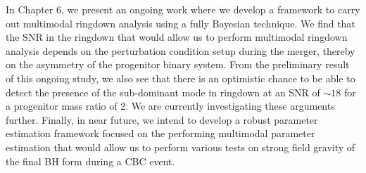 In Chapter 6, we present an ongoing work where we develop a framework to carry out multimodal ringdown analysis using a fully Bayesian technique. We find that the SNR in the ringdown that would allow us to perform multimodal ringdown analysis depends on the perturbation condition setup during the merger, thereby on the asymmetry of the progenitor binary system.  From the preliminary result of this ongoing study, we also see that there is an optimistic chance to be able to detect the presence of the sub-dominant mode in ringdown at an SNR of $\sim 18$ for a progenitor mass ratio of 2.  We are currently investigating these arguments further. Finally, in near future, we intend to develop a robust parameter estimation framework focused on the performing multimodal parameter estimation that would allow us to perform various tests on strong field gravity of the final BH form during a CBC event. 


